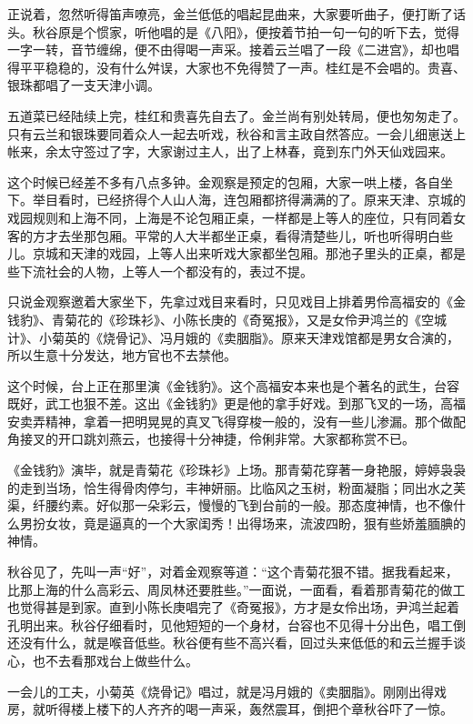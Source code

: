 \documentclass[12pt,UTF8]{ctexbook}
\begin{document}
{{{正说着，忽然听得笛声嘹亮，金兰低低的唱起昆曲来，大家要听曲子，便打断了话头。秋谷原是个惯家，听他唱的是《八阳》，便按着节拍一句一句的听下去，觉得一字一转，音节缠绵，便不由得喝一声采。接着云兰唱了一段《二进宫》，却也唱得平平稳稳的，没有什么舛误，大家也不免得赞了一声。桂红是不会唱的。贵喜、银珠都唱了一支天津小调。

五道菜已经陆续上完，桂红和贵喜先自去了。金兰尚有别处转局，便也匆匆走了。只有云兰和银珠要同着众人一起去听戏，秋谷和言主政自然答应。一会儿细崽送上帐来，余太守签过了字，大家谢过主人，出了上林春，竟到东门外天仙戏园来。

这个时候已经差不多有八点多钟。金观察是预定的包厢，大家一哄上楼，各自坐下。举目看时，已经挤得个人山人海，连包厢都挤得满满的了。原来天津、京城的戏园规则和上海不同，上海是不论包厢正桌，一样都是上等人的座位，只有同着女客的方才去坐那包厢。平常的人大半都坐正桌，看得清楚些儿，听也听得明白些儿。京城和天津的戏园，上等人出来听戏大家都坐包厢。那池子里头的正桌，都是些下流社会的人物，上等人一个都没有的，表过不提。

只说金观察邀着大家坐下，先拿过戏目来看时，只见戏目上排着男伶高福安的《金钱豹》、青菊花的《珍珠衫》、小陈长庚的《奇冤报》，又是女伶尹鸿兰的《空城计》、小菊英的《烧骨记》、冯月娥的《卖胭脂》。原来天津戏馆都是男女合演的，所以生意十分发达，地方官也不去禁他。

这个时候，台上正在那里演《金钱豹》。这个高福安本来也是个著名的武生，台容既好，武工也狠不差。这出《金钱豹》更是他的拿手好戏。到那飞叉的一场，高福安卖弄精神，拿着一把明晃晃的真叉飞得穿梭一般的，没有一些儿渗漏。那个做配角接叉的开口跳刘燕云，也接得十分神捷，伶俐非常。大家都称赏不已。

《金钱豹》演毕，就是青菊花《珍珠衫》上场。那青菊花穿著一身艳服，婷婷袅袅的走到当场，恰生得骨肉停匀，丰神妍丽。比临风之玉树，粉面凝脂；同出水之芙渠，纤腰约素。好似那一朵彩云，慢慢的飞到台前的一般。那态度神情，也不像什么男扮女妆，竟是逼真的一个大家闺秀！出得场来，流波四盼，狠有些娇羞腼腆的神情。

秋谷见了，先叫一声“好”，对着金观察等道：“这个青菊花狠不错。据我看起来，比那上海的什么高彩云、周凤林还要胜些。”一面说，一面看，看着那青菊花的做工也觉得甚是到家。直到小陈长庚唱完了《奇冤报》，方才是女伶出场，尹鸿兰起着孔明出来。秋谷仔细看时，见他短短的一个身材，台容也不见得十分出色，唱工倒还没有什么，就是喉音低些。秋谷便有些不高兴看，回过头来低低的和云兰握手谈心，也不去看那戏台上做些什么。

一会儿的工夫，小菊英《烧骨记》唱过，就是冯月娥的《卖胭脂》。刚刚出得戏房，就听得楼上楼下的人齐齐的喝一声采，轰然震耳，倒把个章秋谷吓了一惊。

}}}
\end{document}
